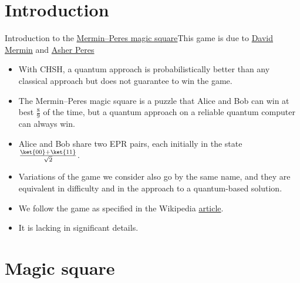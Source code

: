 
\section*{Introduction}



\begin{frame}{Introduction to the \href{https://en.wikipedia.org/wiki/Quantum_pseudo-telepathy\#The_Mermin\%E2\%80\%93Peres_magic_square_game}{Mermin--Peres magic square}}{This game is due to \href{https://en.wikipedia.org/wiki/N._David_Mermin}{David Mermin} and \href{https://en.wikipedia.org/wiki/Asher_Peres}{Asher Peres}}

\begin{itemize}[<+->]
    \item With CHSH, a quantum approach is probabilistically better than any classical approach but does not guarantee to win the game.
    \item The Mermin--Peres magic square is a puzzle that Alice and Bob can win at best $\frac{8}{9}$ of the time, but a quantum approach on a reliable quantum computer can always win.
    \item Alice and Bob share two EPR pairs, each initially in the state $\frac{\ket{00}+\ket{11}}{\sqrt{2}}$.
    \item Variations of the game we consider also go by the same name, and they are equivalent in difficulty and in the approach to a quantum-based solution.
    \item We follow the game as specified in the Wikipedia \href{https://en.wikipedia.org/wiki/Quantum_pseudo-telepathy\#The_Mermin\%E2\%80\%93Peres_magic_square_game}{article}.
    \item It is lacking in significant details.
\end{itemize}
    
\end{frame}



\section*{Magic square}


